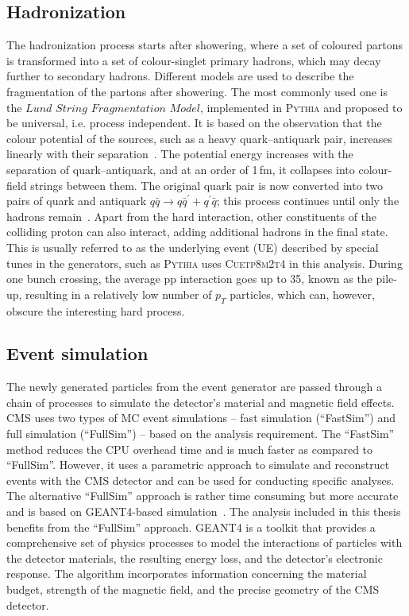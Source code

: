 \subsection{Hadronization}
The hadronization process starts after showering, where a set of coloured partons is transformed into a set of colour-singlet primary hadrons, which may decay further to secondary hadrons. Different models are used to describe the fragmentation of the partons after showering. The most commonly used one is the $Lund$ $String$ $Fragmentation$ $Model$, implemented in \textsc{Pythia} and proposed to be universal, i.e. process independent. It is based on the observation that the colour potential of the sources, such as a heavy quark–antiquark pair, increases linearly with their separation~\cite{Mena:2018zyu}. The potential energy increases with the separation of quark–antiquark, and at an order of 1\,fm, it collapses into colour-field strings between them. The original quark pair is now converted into two pairs of quark and antiquark $q\bar{q}\rightarrow q\bar{q}^{'} + q^{'}\bar{q}$; this process continues until only the hadrons remain~\cite{hadronization}. Apart from the hard interaction, other constituents of the colliding proton can also interact, adding additional hadrons in the final state. This is usually referred to as the underlying event (UE) described by special tunes in the generators, such as \textsc{Pythia} uses \textsc{Cuetp8m2t4} in this analysis. During one bunch crossing, the average pp interaction goes up to 35, known as the pile-up, resulting in a relatively low number of $p_{T}$ particles, which can, however, obscure the interesting hard process.
\subsection{Event simulation}
The newly generated particles from the event generator are passed through a chain of processes to simulate the detector's material and magnetic field effects.  
CMS uses two types of MC event simulations – fast simulation (``FastSim'') and full simulation (``FullSim'') – based on the analysis requirement. The ``FastSim'' method reduces the CPU overhead time and is much faster as compared to ``FullSim''. However, it uses a parametric approach to simulate and reconstruct events with the CMS detector and can be used for conducting specific analyses. The alternative ``FullSim'' approach is rather time consuming but more accurate and is based on \textsc{GEANT4}-based simulation~\cite{Agostinelli:2002hh}. The analysis included in this thesis benefits from the ``FullSim'' approach. \textsc{GEANT4} is a toolkit that provides a comprehensive set of physics processes to model the interactions of particles with the detector materials, the resulting energy loss, and the detector’s electronic response. The algorithm incorporates information concerning the material budget, strength of the magnetic field, and the precise geometry of the CMS detector. 

